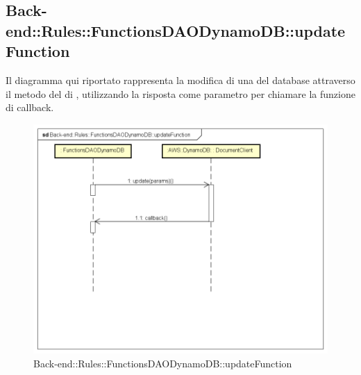 \subsection{Back-end::Rules::FunctionsDAODynamoDB::updateFunction}
Il diagramma qui riportato rappresenta la modifica di una  del database attraverso il metodo  del  di , utilizzando la risposta come parametro per chiamare la funzione di callback. 
 \begin{figure}[h] \centering \includegraphics[width=\textwidth,height=\textheight,keepaspectratio]{images/diagrams/back-end/Ufficial_Backend/Back-endRulesFunctionsDAODynamoDBupdateFunction.png} 	\caption{Back-end::Rules::FunctionsDAODynamoDB::updateFunction}
\end{figure} 
\newpage

